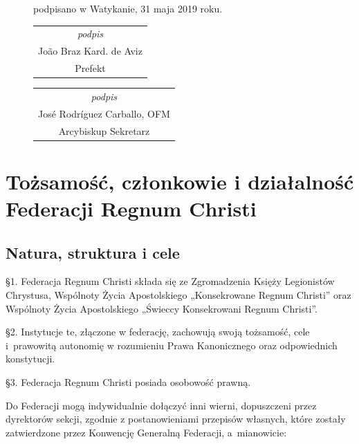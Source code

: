 \begin{figure}
\begin{framed}
\begin{footnotesize}
\begin{center}
podpisano w Watykanie, 31 maja 2019 roku.
\end{center}
 
\hfill\begin{tabular}{c}
{\em podpis} \\
João Braz Kard. de Aviz \\
Prefekt
\end {tabular}


\begin{tabular}{c}
{\em podpis} \\
José Rodríguez Carballo, OFM\\
Arcybiskup Sekretarz 
\end{tabular}
 
\end{footnotesize}
\end{framed}
\end{figure}






\part{Tożsamość, członkowie i działalność\\Federacji Regnum Christi}


\chapter{Natura, struktura i cele}




 \S{}1. Federacja Regnum Christi składa się ze Zgromadzenia Księży Legionistów Chrystusa, Wspólnoty Życia Apostolskiego „Konsekrowane Regnum Christi” oraz Wspólnoty Życia Apostolskiego „Świeccy Konsekrowani Regnum Christi”.


\S{}2. Instytucje te, złączone w federację, zachowują swoją tożsamość, cele \mbox{i prawowitą} autonomię w rozumieniu Prawa Kanonicznego oraz odpowiednich konstytucji.


\S{}3. Federacja Regnum Christi posiada osobowość prawną. 




 Do Federacji mogą indywidualnie dołączyć inni wierni, dopuszczeni przez dyrektorów sekcji, zgodnie z postanowieniami przepisów własnych, które zostały zatwierdzone przez Konwencję Generalną Federacji, \mbox{a mianowicie}:


